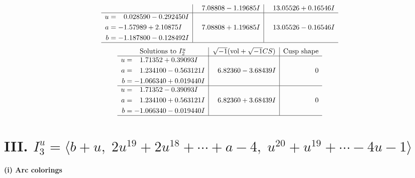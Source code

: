 \documentclass[1p]{elsarticle_modified}
\theoremstyle{definition}
\newcommand{\I}{\sqrt{-1}}
\begin{document}
$$\begin{array}{c|c|c}
 & \phantom{-}7.08808 - 1.19685 I & \phantom{-}13.05526 + 0.16546 I \\ \hline\begin{aligned}
u &= \phantom{-}0.028590 - 0.292450 I \\
a &= -1.57989 + 2.10875 I \\
b &= -1.187800 - 0.128492 I\end{aligned}
 & \phantom{-}7.08808 + 1.19685 I & \phantom{-}13.05526 - 0.16546 I\\
 \hline 
 \end{array}$$\newpage$$\begin{array}{c|c|c}  
\text{Solutions to }I^u_{2}& \I (\text{vol} + \sqrt{-1}CS) & \text{Cusp shape}\\
 \hline 
\begin{aligned}
u &= \phantom{-}1.71352 + 0.39093 I \\
a &= \phantom{-}1.234100 - 0.563121 I \\
b &= -1.066340 + 0.019440 I\end{aligned}
 & \phantom{-}6.82360 - 3.68439 I & \phantom{-0.000000 } 0 \\ \hline\begin{aligned}
u &= \phantom{-}1.71352 - 0.39093 I \\
a &= \phantom{-}1.234100 + 0.563121 I \\
b &= -1.066340 - 0.019440 I\end{aligned}
 & \phantom{-}6.82360 + 3.68439 I & \phantom{-0.000000 } 0\\
 \hline 
 \end{array}$$\newpage\newpage\renewcommand{\arraystretch}{1}
\centering \section*{III. $I^u_{3}= \langle b+u,\;2 u^{19}+2 u^{18}+\cdots+a-4,\;u^{20}+u^{19}+\cdots-4 u-1 \rangle$}
\flushleft \textbf{(i) Arc colorings}\\
\end{document}
